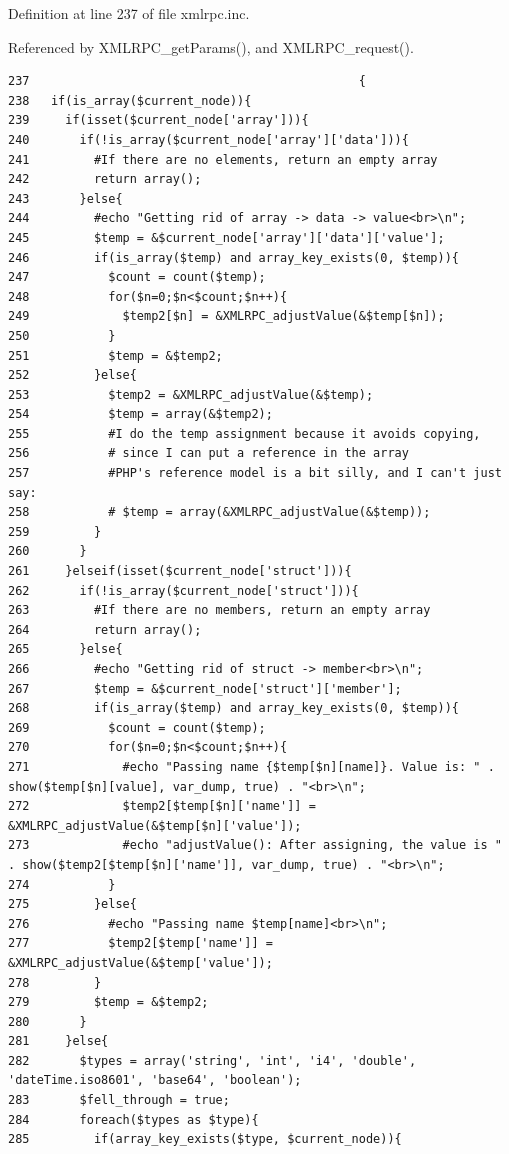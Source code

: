 Definition at line 237 of file xmlrpc.inc.

Referenced by XMLRPC\_\-getParams(), and XMLRPC\_\-request().

\begin{Code}\begin{verbatim}237                                              {
238   if(is_array($current_node)){
239     if(isset($current_node['array'])){
240       if(!is_array($current_node['array']['data'])){
241         #If there are no elements, return an empty array
242         return array();
243       }else{
244         #echo "Getting rid of array -> data -> value<br>\n";
245         $temp = &$current_node['array']['data']['value'];
246         if(is_array($temp) and array_key_exists(0, $temp)){
247           $count = count($temp);
248           for($n=0;$n<$count;$n++){
249             $temp2[$n] = &XMLRPC_adjustValue(&$temp[$n]);
250           }
251           $temp = &$temp2;
252         }else{
253           $temp2 = &XMLRPC_adjustValue(&$temp);
254           $temp = array(&$temp2);
255           #I do the temp assignment because it avoids copying,
256           # since I can put a reference in the array
257           #PHP's reference model is a bit silly, and I can't just say:
258           # $temp = array(&XMLRPC_adjustValue(&$temp));
259         }
260       }
261     }elseif(isset($current_node['struct'])){
262       if(!is_array($current_node['struct'])){
263         #If there are no members, return an empty array
264         return array();
265       }else{
266         #echo "Getting rid of struct -> member<br>\n";
267         $temp = &$current_node['struct']['member'];
268         if(is_array($temp) and array_key_exists(0, $temp)){
269           $count = count($temp);
270           for($n=0;$n<$count;$n++){
271             #echo "Passing name {$temp[$n][name]}. Value is: " . show($temp[$n][value], var_dump, true) . "<br>\n";
272             $temp2[$temp[$n]['name']] = &XMLRPC_adjustValue(&$temp[$n]['value']);
273             #echo "adjustValue(): After assigning, the value is " . show($temp2[$temp[$n]['name']], var_dump, true) . "<br>\n";
274           }
275         }else{
276           #echo "Passing name $temp[name]<br>\n";
277           $temp2[$temp['name']] = &XMLRPC_adjustValue(&$temp['value']);
278         }
279         $temp = &$temp2;
280       }
281     }else{
282       $types = array('string', 'int', 'i4', 'double', 'dateTime.iso8601', 'base64', 'boolean');
283       $fell_through = true;
284       foreach($types as $type){
285         if(array_key_exists($type, $current_node)){

\end{verbatim}
\end{Code}
